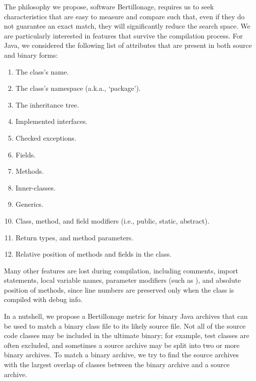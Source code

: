 The philosophy we propose, software Bertillonage, requires us to seek
characteristics that are easy to measure and compare such that, even if
they do not guarantee an exact match, they will significantly reduce the
search space.  We are particularly interested in features that survive the
compilation process.  For Java, we considered the following list of
attributes that are present in both source and binary forms:

\vspace{0.3em}
\begin{enumerate}
\item The class's name.
\item The class's namespace (a.k.a., `package').
\item The inheritance tree.
\item Implemented interfaces.
\item Checked exceptions.
\item Fields.
\item Methods.
\item Inner-classes.
\item Generics.
\item Class, method, and field modifiers (i.e., public, static, abstract).
\item Return types, and method parameters.
\item Relative position of methods and fields in the class.
\end{enumerate}

Many other features are lost during compilation, including comments, import
statements, local variable names,
parameter modifiers (such as ), and absolute position of
methods, since line numbers are preserved only when the class is compiled
with debug info.





In a nutshell, we propose a Bertillonage metric for binary Java archives
that can be used to match a binary class file to its likely source file.
Not all of the source code classes may be included in the ultimate binary;
for example, test classes are often excluded, and sometimes a source
archive may be split into two or more binary archives.  To match a binary
archive, we try to find the source archives with the largest overlap of
classes between the binary archive and a source archive.

